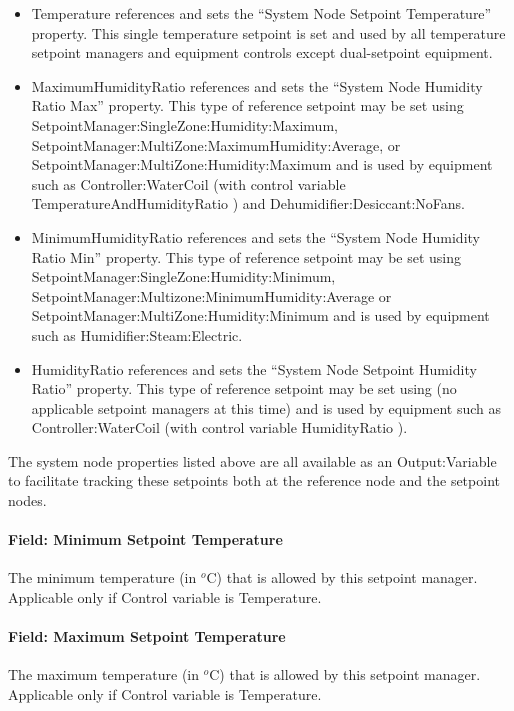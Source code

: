 \begin{itemize}
\item
  Temperature references and sets the ``System Node Setpoint Temperature'' property. This single temperature setpoint is set and used by all temperature setpoint managers and equipment controls except dual-setpoint equipment.
\item
  MaximumHumidityRatio references and sets the ``System Node Humidity Ratio Max'' property. This type of reference setpoint may be set using SetpointManager:SingleZone:Humidity:Maximum, SetpointManager:MultiZone:MaximumHumidity:Average, or SetpointManager:MultiZone:Humidity:Maximum and is used by equipment such as Controller:WaterCoil (with control variable TemperatureAndHumidityRatio ) and Dehumidifier:Desiccant:NoFans.
\item
  MinimumHumidityRatio references and sets the ``System Node Humidity Ratio Min'' property. This type of reference setpoint may be set using SetpointManager:SingleZone:Humidity:Minimum, SetpointManager:Multizone:MinimumHumidity:Average or SetpointManager:MultiZone:Humidity:Minimum and is used by equipment such as Humidifier:Steam:Electric.
\item
  HumidityRatio references and sets the ``System Node Setpoint Humidity Ratio'' property. This type of reference setpoint may be set using (no applicable setpoint managers at this time) and is used by equipment such as Controller:WaterCoil (with control variable HumidityRatio ).
\end{itemize}

The system node properties listed above are all available as an Output:Variable to facilitate tracking these setpoints both at the reference node and the setpoint nodes.

\paragraph{Field: Minimum Setpoint Temperature}\label{field-minimum-setpoint-temperature}

The minimum temperature (in \(^{o}\)C) that is allowed by this setpoint manager. Applicable only if Control variable is Temperature.

\paragraph{Field: Maximum Setpoint Temperature}\label{field-maximum-setpoint-temperature}

The maximum temperature (in \(^{o}\)C) that is allowed by this setpoint manager. Applicable only if Control variable is Temperature.

